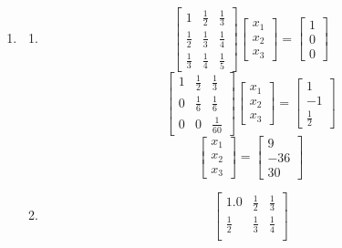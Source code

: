 \documentclass[11pt,twoside]{article}
\begin{document}
\begin{enumerate}
\item
	\begin{enumerate}
		\item 	%
				\[ \left. \begin{bmatrix}
				1 		& \frac{1}{2} & \frac{1}{3} \\
				\frac{1}{2} & \frac{1}{3} & \frac{1}{4} \\
				\frac{1}{3} & \frac{1}{4} & \frac{1}{5} \end{bmatrix}
				 \right. 
				 \left. \begin{bmatrix}
				x_1  \\
				x_2   \\
				x_3   \end{bmatrix} \right. = \left. \begin{bmatrix}
				1  \\
				0   \\
				0   \end{bmatrix} \right.\] 
				\[ \left. \begin{bmatrix}
				1 &\frac{1}{2} & \frac{1}{3} \\
				0 &\frac{1}{6} & \frac{1}{6} \\
				0 &0 		      & \frac{1}{60} \end{bmatrix}
				 \right. 
				 \left. \begin{bmatrix}
				x_1  \\
				x_2   \\
				x_3   \end{bmatrix} \right. = \left. \begin{bmatrix}
				1  \\
				-1   \\
				\frac{1}{2}   \end{bmatrix} \right.\] 
				\[ \left. \begin{bmatrix}
				x_1  \\
				x_2   \\
				x_3   \end{bmatrix} \right. = \left. \begin{bmatrix}
				9  \\
				-36   \\
				30   \end{bmatrix} \right.\] 
		\item		\[ \left. \begin{bmatrix}
				1.0 		& \frac{1}{2} & \frac{1}{3} \\
				\frac{1}{2} & \frac{1}{3} & \frac{1}{4} \\

\end{bmatrix}\]
\end{enumerate}
\end{enumerate}
\end{document}
